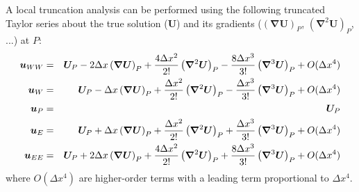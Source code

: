 \documentclass[sn-mathphys,Numbered]{sn-jnl}%
\newcommand{\bb}{\boldsymbol}
\begin{document}
\begin{appendices}
A local truncation analysis can be performed using the following truncated Taylor series about the true solution ($\bb{U}$) and its gradients ($\left( \bb{\nabla} \bb{U} \right)_P$, $\left( \bb{\nabla}^2 \bb{U} \right)_P$, $...$) at $P$:
\begin{eqnarray} \label{eq:taylor_series_1d}
	\bb{u}_{WW} &=& \bb{U}_P - 2\Delta x \left( \bb{\nabla} \bb{U} \right)_P + \frac{4\Delta x^2}{2!} \left( \bb{\nabla}^2 \bb{U} \right)_P
		- \frac{8\Delta x^3}{3!} \left( \bb{\nabla}^3 \bb{U} \right)_P + O(\Delta x^4) \notag \\
	\bb{u}_W &=& \bb{U}_P - \Delta x \left( \bb{\nabla} \bb{U} \right)_P + \frac{\Delta x^2}{2!} \left( \bb{\nabla}^2 \bb{U} \right)_P
		- \frac{\Delta x^3}{3!} \left( \bb{\nabla}^3 \bb{U} \right)_P + O(\Delta x^4) \notag \\
	\bb{u}_P &=& \bb{U}_P \notag \\
	\bb{u}_E &=& \bb{U}_P + \Delta x \left( \bb{\nabla} \bb{U} \right)_P + \frac{\Delta x^2}{2!} \left( \bb{\nabla}^2 \bb{U} \right)_P 
		+ \frac{\Delta x^3}{3!} \left( \bb{\nabla}^3 \bb{U} \right)_P + O(\Delta x^4) \notag \\
	\bb{u}_{EE} &=& \bb{U}_P + 2\Delta x \left( \bb{\nabla} \bb{U} \right)_P + \frac{4\Delta x^2}{2!} \left( \bb{\nabla}^2 \bb{U} \right)_P 
		+ \frac{8\Delta x^3}{3!} \left( \bb{\nabla}^3 \bb{U} \right)_P + O(\Delta x^4)
\end{eqnarray}
where $O(\Delta x^4)$ are higher-order terms with a leading term proportional to $\Delta x^4$.


\end{appendices}
\end{document}
